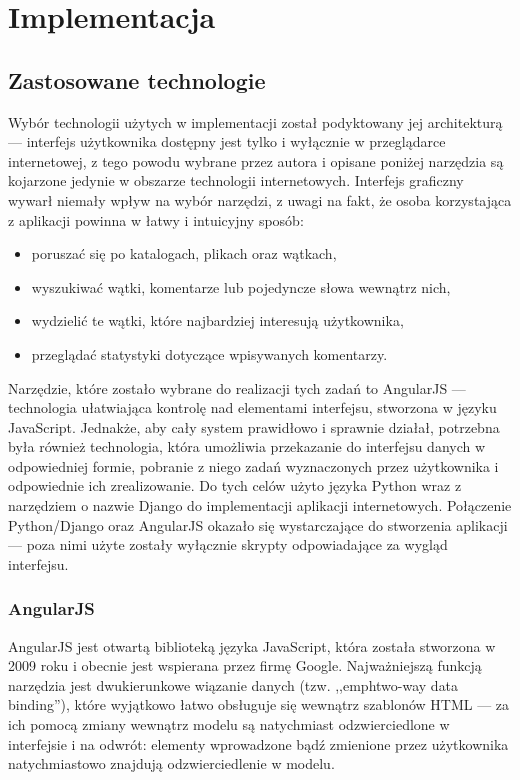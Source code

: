 \chapter{Implementacja}

\section{Zastosowane technologie}

Wybór technologii użytych w implementacji został podyktowany jej architekturą --- interfejs użytkownika dostępny jest tylko i wyłącznie w przeglądarce internetowej, z tego powodu wybrane przez autora i opisane poniżej narzędzia są kojarzone jedynie w obszarze technologii internetowych. Interfejs graficzny wywarł niemały wpływ na wybór narzędzi, z uwagi na fakt, że osoba korzystająca z aplikacji powinna w łatwy i intuicyjny sposób:

\begin{itemize}[noitemsep]
  \item poruszać się po katalogach, plikach oraz wątkach,
  \item wyszukiwać wątki, komentarze lub pojedyncze słowa wewnątrz nich,
  \item wydzielić te wątki, które najbardziej interesują użytkownika,
  \item przeglądać statystyki dotyczące wpisywanych komentarzy.
\end{itemize}

Narzędzie, które zostało wybrane do realizacji tych zadań to AngularJS \cite{angular} --- technologia ułatwiająca kontrolę nad elementami interfejsu, stworzona w języku JavaScript. Jednakże, aby cały system prawidłowo i sprawnie działał, potrzebna była również technologia, która umożliwia przekazanie do interfejsu danych w odpowiedniej formie, pobranie z niego zadań wyznaczonych przez użytkownika i odpowiednie ich zrealizowanie. Do tych celów użyto języka Python \cite{python} wraz z narzędziem o nazwie Django \cite{django} do implementacji aplikacji internetowych. Połączenie Python/Django oraz AngularJS okazało się wystarczające do stworzenia aplikacji --- poza nimi użyte zostały wyłącznie skrypty odpowiadające za wygląd interfejsu.

\subsection*{AngularJS}

AngularJS jest otwartą biblioteką języka JavaScript, która została stworzona w 2009 roku i obecnie jest wspierana przez firmę Google. Najważniejszą funkcją narzędzia jest dwukierunkowe wiązanie danych (tzw. ,,emph{two-way data binding}''), które wyjątkowo łatwo obsługuje się wewnątrz szablonów HTML --- za ich pomocą zmiany wewnątrz modelu są natychmiast odzwierciedlone w interfejsie i na odwrót: elementy wprowadzone bądź zmienione przez użytkownika natychmiastowo znajdują odzwierciedlenie w modelu.

